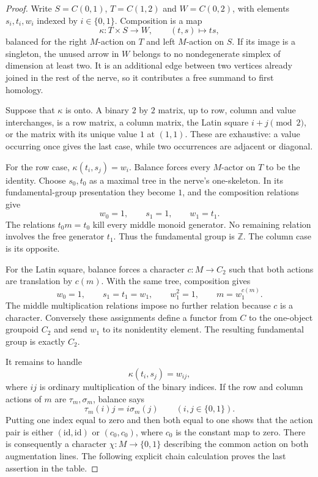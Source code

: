 \begin{proof}
Write $S=C(0,1)$, $T=C(1,2)$ and $W=C(0,2)$, with
elements $s_i,t_i,w_i$ indexed by $i\in\{0,1\}$.
Composition is a map
\[
 \kappa:T\times S\longrightarrow W,
 \qquad (t,s)\longmapsto ts,
\]
balanced for the right $M$-action on $T$ and left $M$-action
on $S$.  If its image is a singleton, the unused arrow in
$W$ belongs to no nondegenerate simplex of dimension at least
two.  It is an additional edge between two vertices already
joined in the rest of the nerve, so it contributes a free
summand to first homology.

Suppose that $\kappa$ is onto.  A binary $2$ by $2$ matrix,
up to row, column and value interchanges, is a row matrix, a
column matrix, the Latin square $i+j\pmod2$, or the matrix
with its unique value $1$ at $(1,1)$.  These are exhaustive:
a value occurring once gives the last case, while two
occurrences are adjacent or diagonal.

For the row case, $\kappa(t_i,s_j)=w_i$.  Balance forces
every $M$-actor on $T$ to be the identity.  Choose $s_0,t_0$
as a maximal tree in the nerve's one-skeleton.  In its
fundamental-group presentation they become $1$, and the
composition relations give
\[
 w_0=1,\qquad s_1=1,\qquad w_1=t_1.
\]
The relations $t_0m=t_0$ kill every middle monoid generator.
No remaining relation involves the free generator $t_1$.
Thus the fundamental group is $\mathbb Z$.  The column case
is its opposite.

For the Latin square, balance forces a character
$c:M\to C_2$ such that both actions are translation by
$c(m)$.  With the same tree, composition gives
\[
 w_0=1,\qquad s_1=t_1=w_1,\qquad w_1^2=1,
 \qquad m=w_1^{c(m)}.
\]
The middle multiplication relations impose no further
relation because $c$ is a character.  Conversely these
assignments define a functor from $C$ to the one-object
groupoid $C_2$ and send $w_1$ to its nonidentity element.
The resulting fundamental group is exactly $C_2$.

It remains to handle
\[
 \kappa(t_i,s_j)=w_{ij},
\]
where $ij$ is ordinary multiplication of the binary indices.
If the row and column actions of $m$ are $\tau_m,\sigma_m$,
balance says
\[
 \tau_m(i)j=i\sigma_m(j)\qquad(i,j\in\{0,1\}).
\]
Putting one index equal to zero and then both equal to one
shows that the action pair is either $(\mathrm{id},\mathrm{id})$
or $(c_0,c_0)$, where $c_0$ is the constant map to zero.
There is consequently a character
$\chi:M\to\{0,1\}$ describing the common action on both
augmentation lines.  The following explicit chain
calculation proves the last assertion in the table.
\end{proof}

